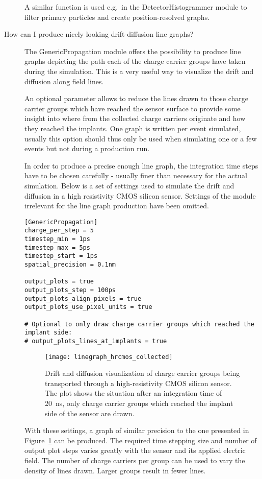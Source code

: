 \begin{description}
A similar function is used e.g.\ in the DetectorHistogrammer module to filter primary particles and create position-resolved graphs.

\item[How can I produce nicely looking drift-diffusion line graphs?]
The GenericPropagation module offers the possibility to produce line graphs depicting the path each of the charge carrier groups have taken during the simulation. This is a very useful way to visualize the drift and diffusion along field lines.

An optional parameter allows to reduce the lines drawn to those charge carrier groups which have reached the sensor surface to provide some insight into where from the collected charge carriers originate and how they reached the implants.
One graph is written per event simulated, usually this option should thus only be used when simulating one or a few events but not during a production run.

In order to produce a precise enough line graph, the integration time steps have to be chosen carefully - usually finer than necessary for the actual simulation. Below is a set of settings used to simulate the drift and diffusion in a high resistivity CMOS silicon sensor.
Settings of the module irrelevant for the line graph production have been omitted.

\begin{verbatim}
[GenericPropagation]
charge_per_step = 5
timestep_min = 1ps
timestep_max = 5ps
timestep_start = 1ps
spatial_precision = 0.1nm

output_plots = true
output_plots_step = 100ps
output_plots_align_pixels = true
output_plots_use_pixel_units = true

# Optional to only draw charge carrier groups which reached the implant side:
# output_plots_lines_at_implants = true
\end{verbatim}

\begin{figure}[tbp]
    \centering
  \texttt{[image: linegraph\_hrcmos\_collected]}
  \caption{Drift and diffusion visualization of charge carrier groups being transported through a high-resistivity CMOS silicon sensor. The plot shows the situation after an integration time of \SI{20}{\nano \second}, only charge carrier groups which reached the implant side of the sensor are drawn.}
  \label{fig:linegraph}
\end{figure}

With these settings, a graph of similar precision to the one presented in Figure~\ref{fig:linegraph} can be produced.
The required time stepping size and number of output plot steps varies greatly with the sensor and its applied electric field.
The number of charge carriers per group can be used to vary the density of lines drawn. Larger groups result in fewer lines.

\end{description}

